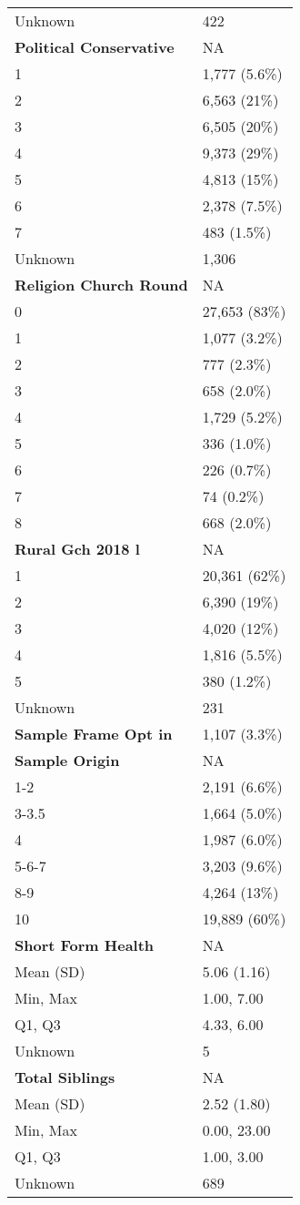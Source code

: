 \documentclass[
  single column]{article}
\begin{document}
\begin{longtable}[]{@{}ll@{}}
Unknown & 422 \\
\textbf{Political Conservative} & NA \\
1 & 1,777 (5.6\%) \\
2 & 6,563 (21\%) \\
3 & 6,505 (20\%) \\
4 & 9,373 (29\%) \\
5 & 4,813 (15\%) \\
6 & 2,378 (7.5\%) \\
7 & 483 (1.5\%) \\
Unknown & 1,306 \\
\textbf{Religion Church Round} & NA \\
0 & 27,653 (83\%) \\
1 & 1,077 (3.2\%) \\
2 & 777 (2.3\%) \\
3 & 658 (2.0\%) \\
4 & 1,729 (5.2\%) \\
5 & 336 (1.0\%) \\
6 & 226 (0.7\%) \\
7 & 74 (0.2\%) \\
8 & 668 (2.0\%) \\
\textbf{Rural Gch 2018 l} & NA \\
1 & 20,361 (62\%) \\
2 & 6,390 (19\%) \\
3 & 4,020 (12\%) \\
4 & 1,816 (5.5\%) \\
5 & 380 (1.2\%) \\
Unknown & 231 \\
\textbf{Sample Frame Opt in} & 1,107 (3.3\%) \\
\textbf{Sample Origin} & NA \\
1-2 & 2,191 (6.6\%) \\
3-3.5 & 1,664 (5.0\%) \\
4 & 1,987 (6.0\%) \\
5-6-7 & 3,203 (9.6\%) \\
8-9 & 4,264 (13\%) \\
10 & 19,889 (60\%) \\
\textbf{Short Form Health} & NA \\
Mean (SD) & 5.06 (1.16) \\
Min, Max & 1.00, 7.00 \\
Q1, Q3 & 4.33, 6.00 \\
Unknown & 5 \\
\textbf{Total Siblings} & NA \\
Mean (SD) & 2.52 (1.80) \\
Min, Max & 0.00, 23.00 \\
Q1, Q3 & 1.00, 3.00 \\
Unknown & 689 \\

\end{longtable}
\end{document}
